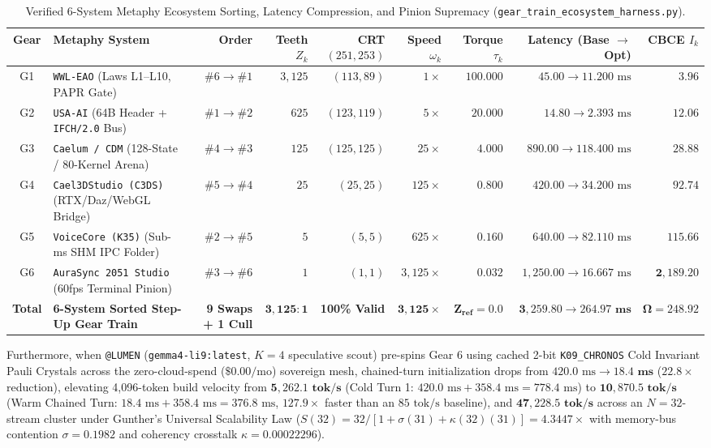 \documentclass[10pt,twocolumn]{article}
\begin{document}
\begin{table}[t]
\centering
\caption{Verified 6-System Metaphy Ecosystem Sorting, Latency Compression, and Pinion Supremacy (\texttt{gear\_train\_ecosystem\_harness.py}).}
\label{tab:fleet}
\small
\begin{tabular}{@{}clrrrrrrr@{}}
\toprule
\textbf{Gear} & \textbf{Metaphy System} & \textbf{Order} & \textbf{Teeth $Z_k$} & \textbf{CRT $(251,253)$} & \textbf{Speed $\omega_k$} & \textbf{Torque $\tau_k$} & \textbf{Latency (Base $\to$ Opt)} & \textbf{CBCE $I_k$} \\
\midrule
G1 & \texttt{WWL-EAO} (Laws L1--L10, PAPR Gate) & $\#6 \to \#1$ & $3{,}125$ & $(113, 89)$ & $1\times$ & $100.000$ & $45.00 \to 11.200\text{ ms}$ & $3.96$ \\
G2 & \texttt{USA-AI} (64B Header + \texttt{IFCH/2.0} Bus) & $\#1 \to \#2$ & $625$ & $(123, 119)$ & $5\times$ & $20.000$ & $14.80 \to 2.393\text{ ms}$ & $12.06$ \\
G3 & \texttt{Caelum / CDM} (128-State / 80-Kernel Arena) & $\#4 \to \#3$ & $125$ & $(125, 125)$ & $25\times$ & $4.000$ & $890.00 \to 118.400\text{ ms}$ & $28.88$ \\
G4 & \texttt{Cael3DStudio (C3DS)} (RTX/Daz/WebGL Bridge) & $\#5 \to \#4$ & $25$ & $(25, 25)$ & $125\times$ & $0.800$ & $420.00 \to 34.200\text{ ms}$ & $92.74$ \\
G5 & \texttt{VoiceCore (K35)} (Sub-ms SHM IPC Folder) & $\#2 \to \#5$ & $5$ & $(5, 5)$ & $625\times$ & $0.160$ & $640.00 \to 82.110\text{ ms}$ & $115.66$ \\
G6 & \texttt{AuraSync 2051 Studio} (60fps Terminal Pinion) & $\#3 \to \#6$ & $1$ & $(1, 1)$ & $3{,}125\times$ & $0.032$ & $1{,}250.00 \to 16.667\text{ ms}$ & $\mathbf{2{,}189.20}$ \\
\midrule
\textbf{Total} & \textbf{6-System Sorted Step-Up Gear Train} & \textbf{9 Swaps + 1 Cull} & $\mathbf{3{,}125:1}$ & \textbf{100\% Valid} & $\mathbf{3{,}125\times}$ & $\mathbf{Z_{\text{ref}}=0.0}$ & $\mathbf{3{,}259.80 \to 264.97\text{ ms}}$ & $\mathbf{\Omega = 248.92}$ \\
\bottomrule
\end{tabular}
\end{table}

Furthermore, when \texttt{@LUMEN} (\texttt{gemma4-li9:latest}, $K=4$ speculative scout) pre-spins Gear 6 using cached 2-bit \texttt{K09\_CHRONOS} Cold Invariant Pauli Crystals across the zero-cloud-spend ($\text{\$0.00/mo}$) sovereign mesh, chained-turn initialization drops from $420.0\text{ ms} \to \mathbf{18.4\text{ ms}}$ ($22.8\times$ reduction), elevating 4,096-token build velocity from $\mathbf{5{,}262.1\text{ tok/s}}$ (Cold Turn 1: $420.0\text{ ms} + 358.4\text{ ms} = 778.4\text{ ms}$) to $\mathbf{10{,}870.5\text{ tok/s}}$ (Warm Chained Turn: $18.4\text{ ms} + 358.4\text{ ms} = 376.8\text{ ms}$, $127.9\times$ faster than an $85\text{ tok/s}$ baseline), and $\mathbf{47{,}228.5\text{ tok/s}}$ across an $N=32$-stream cluster under Gunther's Universal Scalability Law ($S(32) = 32 / [1 + \sigma(31) + \kappa(32)(31)] = 4.3447\times$ with memory-bus contention $\sigma = 0.1982$ and coherency crosstalk $\kappa = 0.00022296$).
\end{document}
